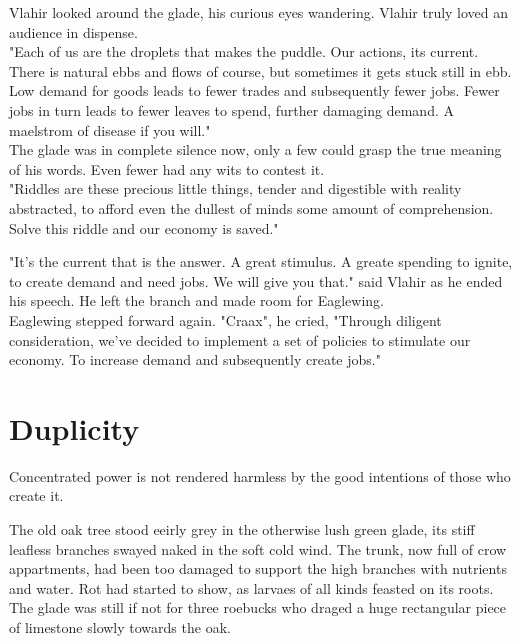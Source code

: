 \documentclass[smalldemyvopaper,11pt,twoside,onecolumn,openright,extrafontsizes]{memoir}
\newlength\drop
\begin{document}
Vlahir looked around the glade, his curious eyes wandering. Vlahir truly loved an audience in dispense.\\

"Each of us are the droplets that makes the puddle. Our actions, its current. There is natural ebbs and flows of course, but sometimes it gets stuck still in ebb. Low demand for goods leads to fewer trades and subsequently fewer jobs. Fewer jobs in turn leads to fewer leaves to spend, further damaging demand. A maelstrom of disease if you will."\\

The glade was in complete silence now, only a few could grasp the true meaning of his words. Even fewer had any wits to contest it. \\

"Riddles are these precious little things, tender and digestible with reality abstracted, to afford even the dullest of minds some amount of comprehension. Solve this riddle and our economy is saved."

"It's the current that is the answer. A great stimulus. A greate spending to ignite, to create demand and need jobs. We will give you that." said Vlahir as he ended his speech. He left the branch and made room for Eaglewing.\\

Eaglewing stepped forward again. "Craax", he cried, "Through diligent consideration, we've decided to implement a set of policies to stimulate our economy. To increase demand and subsequently create jobs."



\chapter{Duplicity}

Concentrated power is not rendered harmless by the good intentions of those who create it.

The old oak tree stood eeirly grey in the otherwise lush green glade, its stiff leafless branches swayed naked in the soft cold wind. The trunk, now full of crow appartments, had been too damaged to support the high branches with nutrients and water. Rot had started to show, as larvaes of all kinds feasted on its roots. The glade was still if not for three roebucks who draged a huge rectangular piece of limestone slowly towards the oak.
\end{document}
